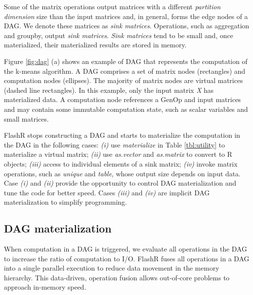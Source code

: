 Some of the matrix operations output matrices with
a different \textit{partition dimension} size than the input matrices and,
in general, forms the edge nodes of a DAG. We denote these matrices as
\textit{sink matrices}. Operations, such as aggregation and groupby,
output \textit{sink matrices}. \textit{Sink matrices} tend to be small and, once
materialized, their materialized results are stored in memory.

Figure \ref{fig:dag} (a) shows an example of DAG that represents the computation
of the k-means algorithm. A DAG comprises a set of
matrix nodes (rectangles) and computation nodes (ellipses). The majority of
matrix nodes are virtual matrices (dashed line rectangles).
In this example, only the input matrix \textit{X} has materialized data.
A computation node references a GenOp and input matrices and
may contain some immutable computation state, such as scalar variables and
small matrices. 

FlashR stops constructing a DAG and starts to materialize the computation
in the DAG in the following cases: \textit{(i)} use \textit{materialize}
in Table \ref{tbl:utility} to materialize a virtual matrix;
\textit{(ii)} use \textit{as.vector} and \textit{as.matrix} to convert
to R objects; \textit{(iii)} access to individual elements of a sink matrix;
\textit{(iv)} invoke matrix operations, such as \textit{unique} and \textit{table},
whose output size depends on input data. Case \textit{(i)} and \textit{(ii)}
provide the opportunity to control DAG materialization and tune
the code for better speed. Cases \textit{(iii)} and \textit{(iv)} are
implicit DAG materialization to simplify programming.

\subsection{DAG materialization}\label{sec:materialize}
When computation in a DAG is triggered, we evaluate all operations in the DAG
to increase the ratio of computation to I/O. FlashR fuses all operations in
a DAG into a single parallel execution to reduce data
movement in the memory hierarchy. This data-driven,
operation fusion allows out-of-core problems to approach in-memory speed.

